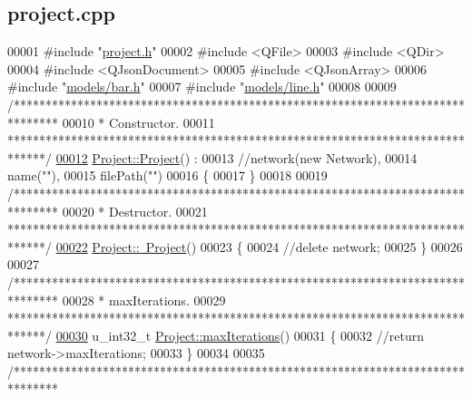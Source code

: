 \hypertarget{project_8cpp_source}{}\subsection{project.\+cpp}
\label{project_8cpp_source}

\begin{DoxyCode}
00001 \textcolor{preprocessor}{#include "\hyperlink{project_8h}{project.h}"}
00002 \textcolor{preprocessor}{#include <QFile>}
00003 \textcolor{preprocessor}{#include <QDir>}
00004 \textcolor{preprocessor}{#include <QJsonDocument>}
00005 \textcolor{preprocessor}{#include <QJsonArray>}
00006 \textcolor{preprocessor}{#include "\hyperlink{bar_8h}{models/bar.h}"}
00007 \textcolor{preprocessor}{#include "\hyperlink{line_8h}{models/line.h}"}
00008 
00009 \textcolor{comment}{/*******************************************************************************}
00010 \textcolor{comment}{ * Constructor.}
00011 \textcolor{comment}{ ******************************************************************************/}
\hypertarget{project_8cpp_source_l00012}{}\hyperlink{class_project_aa007ecd17d5bc800e7a956cf666eea21}{00012} \hyperlink{class_project_aa007ecd17d5bc800e7a956cf666eea21}{Project::Project}() :
00013   \textcolor{comment}{//network(new Network),}
00014   name(\textcolor{stringliteral}{""}),
00015   filePath(\textcolor{stringliteral}{""})
00016 \{
00017 \}
00018 
00019 \textcolor{comment}{/*******************************************************************************}
00020 \textcolor{comment}{ * Destructor.}
00021 \textcolor{comment}{ ******************************************************************************/}
\hypertarget{project_8cpp_source_l00022}{}\hyperlink{class_project_ad165d61b76ee86ee9c27fd987a2a7b9e}{00022} \hyperlink{class_project_ad165d61b76ee86ee9c27fd987a2a7b9e}{Project::~Project}()
00023 \{
00024   \textcolor{comment}{//delete network;}
00025 \}
00026 
00027 \textcolor{comment}{/*******************************************************************************}
00028 \textcolor{comment}{ * maxIterations.}
00029 \textcolor{comment}{ ******************************************************************************/}
\hypertarget{project_8cpp_source_l00030}{}\hyperlink{class_project_ad85e1754cbab65e20f269e79c5caa789}{00030} u\_int32\_t \hyperlink{class_project_ad85e1754cbab65e20f269e79c5caa789}{Project::maxIterations}()
00031 \{
00032   \textcolor{comment}{//return network->maxIterations;}
00033 \}
00034 
00035 \textcolor{comment}{/*******************************************************************************}

\end{DoxyCode}
